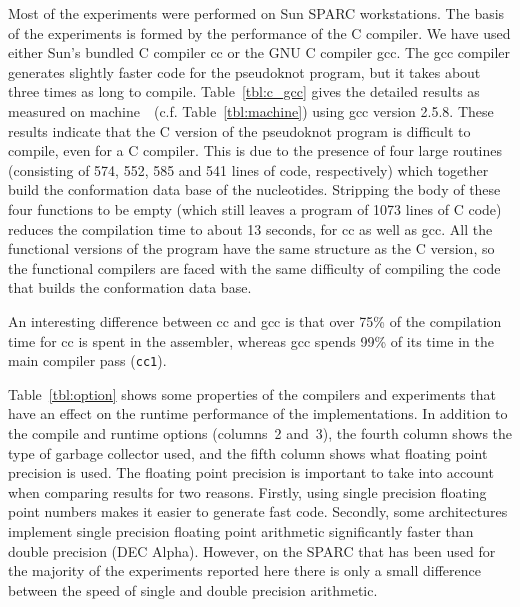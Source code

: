 Most of the experiments were performed on Sun SPARC workstations. The
basis of the experiments is formed by the performance of the C
compiler. We have used either Sun's bundled C compiler cc or the GNU C
compiler gcc.  The gcc compiler generates slightly faster code for the
pseudoknot program, but it takes about three times as long to compile.
Table~\ref{tbl:c_gcc} gives the detailed results as measured on
machine~\sysfast~(c.f. Table~\ref{tbl:machine}) using gcc version
2.5.8. These results indicate that the C version of the pseudoknot
program is difficult to compile, even for a C compiler. This is due to
the presence of four large routines (consisting of 574, 552, 585 and
541 lines of code, respectively) which together build the conformation
data base of the nucleotides. Stripping the body of these four
functions to be empty (which still leaves a program of 1073 lines of C
code) reduces the compilation time to about 13 seconds, for cc as well
as gcc. All the functional versions of the program have the same
structure as the C version, so the functional compilers are faced with
the same difficulty of compiling the code that builds the conformation
data base.

An interesting difference between cc and gcc is that over 75\% of the
compilation time for cc is spent in the assembler, whereas gcc spends
99\% of its time in the main compiler pass (\verb=cc1=).

Table~\ref{tbl:option} shows some properties of the compilers and
experiments that have an effect on the runtime performance of the
implementations. In addition to the compile and runtime options
(columns~2 and~3), the fourth column shows the type of garbage
collector used, and the fifth column shows what floating point
precision is used.
The floating point precision is important to take into account when
comparing results for two reasons. Firstly, using single precision
floating point numbers makes it easier to generate fast code. Secondly,
some architectures implement single precision floating point arithmetic
significantly faster than double precision (DEC Alpha). However, on the
SPARC that has been used for the majority of the experiments reported
here there is only a small difference between the speed of single and
double precision arithmetic.

